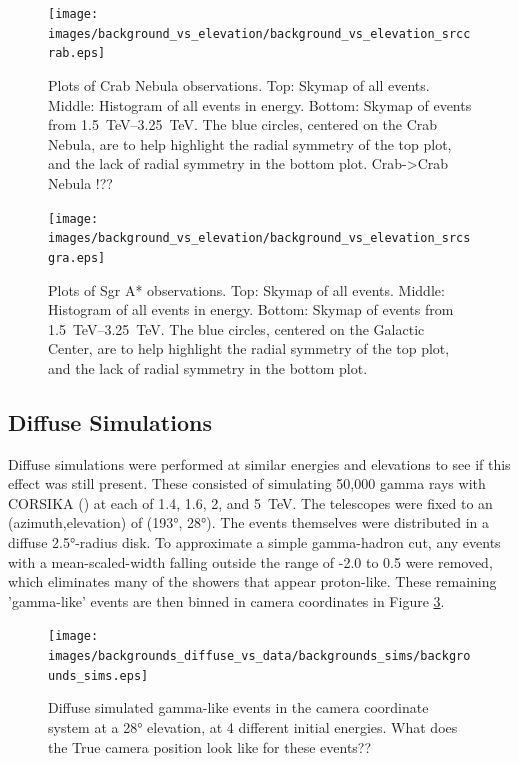   \begin{figure}[ht]
    \centering
    \texttt{[image: images/background\_vs\_elevation/background\_vs\_elevation\_srccrab.eps]}
    \caption[Background Vs Elevation Crab]
    {\small 
      Plots of Crab Nebula observations.
      Top: Skymap of all events.
      Middle: Histogram of all events in energy.
      Bottom: Skymap of events from \SIrange{1.5}{3.25}{\TeV}.  
      The blue circles, centered on the Crab Nebula, are to help highlight the radial symmetry of the top plot, and the lack of radial symmetry in the bottom plot.
      {\color{red}Crab->Crab Nebula !??}
    }
    \label{fig:bkgvsel_crab}
  \end{figure}

  \begin{figure}[ht]
    \centering
    \texttt{[image: images/background\_vs\_elevation/background\_vs\_elevation\_srcsgra.eps]}
    \caption[Background Vs Elevation Sgr A*]
    {\small 
      Plots of Sgr A* observations.
      Top: Skymap of all events.
      Middle: Histogram of all events in energy.
      Bottom: Skymap of events from \SIrange{1.5}{3.25}{\TeV}.  
      The blue circles, centered on the Galactic Center, are to help highlight the radial symmetry of the top plot, and the lack of radial symmetry in the bottom plot.
    }
    \label{fig:bkgvsel_sgra}
  \end{figure}
  
  \FloatBarrier

  \subsection{Diffuse Simulations}\label{subsubsec:diffusesims}
    Diffuse simulations were performed at similar energies and elevations to see if this effect was still present.
    These consisted of simulating 50,000 gamma rays with CORSIKA (\cite{corsika1998}) at each of 1.4, 1.6, 2, and \SI{5}{\TeV}.
    The telescopes were fixed to an (azimuth,elevation) of (\ang{193}, \ang{28}).
    The events themselves were distributed in a diffuse \ang{2.5}-radius disk.
    To approximate a simple gamma-hadron cut, any events with a mean-scaled-width falling outside the range of -2.0 to 0.5 were removed, which eliminates many of the showers that appear proton-like.
    These remaining 'gamma-like' events are then binned in camera coordinates in Figure \ref{fig:back_simdiffuse}.

    \begin{figure}[ht]
      \centering
      \texttt{[image: images/backgrounds\_diffuse\_vs\_data/backgrounds\_sims/backgrounds\_sims.eps]}
      \caption[Diffuse Simulated Backgrounds]{
        Diffuse simulated gamma-like events in the camera coordinate system at a \ang{28} elevation, at 4 different initial energies.
        {\color{red}What does the True camera position look like for these events??}
      }
      \label{fig:back_simdiffuse}
    \end{figure}

